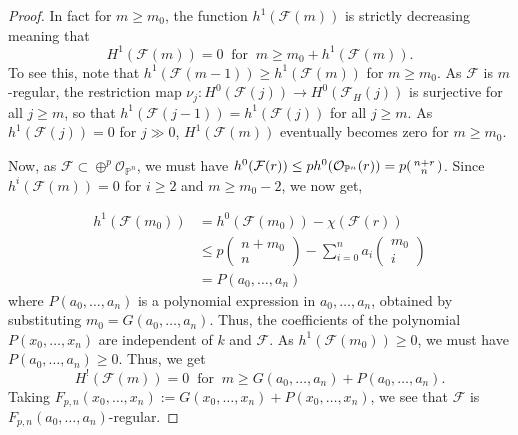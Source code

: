 \documentclass[ignorenonframetext,t]{beamer}
\newcommand{\sF}{{\mathcal F}}
\newcommand{\sO}{{\mathcal O}}
\renewcommand{\P}{{\mathbb P}}
\theoremstyle{definition}
\begin{document}
\begin{proof}
	In fact for $m\geq m_0$, the function $h^1(\sF(m))$ is strictly decreasing meaning that 
	\[H^1(\sF(m))=0 \;\;\text{for}\;\; m\geq m_0+h^1(\sF(m)).\]
	To see this, note that $h^1(\sF(m-1))\geq h^1(\sF(m))$ for $m\geq m_0$. As $\sF$ is $m$-regular, the restriction map $\nu_j: H^0(\sF(j))\rightarrow H^0(\sF_H(j))$ is surjective for all $j\geq m$, so that $h^1(\sF(j-1))=h^1(\sF(j))$ for all $j\geq m$. As $h^1(\sF(j))=0$ for $j\gg 0$, $H^1(\sF(m))$ eventually becomes zero for $m\geq m_0$.
	
	Now, as $\sF\subset \oplus^p \sO_{\P^n}$, we must have $h^0(\sF(r))\leq p h^0(\sO_{\P^n}(r))= p 
	\begin{psmallmatrix}
	n+r\\
	n
	\end{psmallmatrix}
	$. Since $h^i(\sF(m))=0$ for $i\geq 2$ and $m\geq m_0 -2$, we now get,
	
	\begin{align*}
	h^1(\sF(m_0)) & = h^0(\sF(m_0)) - \chi(\sF(r))\\
	&\leq p
	\begin{pmatrix}
	n+ m_0\\
	n
	\end{pmatrix} - \sum_{i=0}^{n}a_i 
	\begin{pmatrix}
	m_0\\
	i
	\end{pmatrix}\\
	&= P(a_0,\ldots,a_n)
	\end{align*}
	where $P(a_0,\ldots,a_n)$ is a polynomial expression in $a_0,\ldots,a_n$, obtained by substituting $m_0=G(a_0,\ldots,a_n)$. Thus, the coefficients of the polynomial $P(x_0,\ldots,x_n)$ are independent of $k$ and $\sF$. As $h^1(\sF(m_0))\geq 0$, we must have $P(a_0,\ldots,a_n)\geq 0$. Thus, we get
	\[ H^!(\sF(m))=0 \;\; \text{for}\;\; m\geq G(a_0,\ldots,a_n) + P(a_0,\ldots,a_n).\]
	Taking $F_{p,n}(x_0,\ldots,x_n):= G(x_0,\ldots,x_n)+ P(x_0,\ldots, x_n)$, we see that $\sF$ is $F_{p,n}(a_0,\ldots,a_n)$-regular.
\end{proof}




\end{document}

